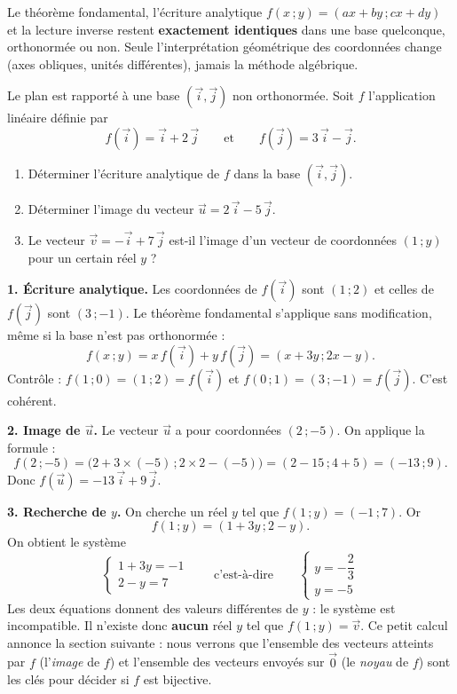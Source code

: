 \documentclass[11pt]{article}
\begin{document}
\begin{aretenir}
Le théorème fondamental, l'écriture analytique $f(x\,; y) = (ax + by\,; cx + dy)$ et la lecture inverse restent \textbf{exactement identiques} dans une base quelconque, orthonormée ou non. Seule l'interprétation géométrique des coordonnées change (axes obliques, unités différentes), jamais la méthode algébrique.
\end{aretenir}

\begin{exoresolu}
Le plan est rapporté à une base $(\vec{i}, \vec{j})$ non orthonormée. Soit $f$ l'application linéaire définie par
\[ f(\vec{i}) = \vec{i} + 2\,\vec{j} \qquad \text{et} \qquad f(\vec{j}) = 3\,\vec{i} - \vec{j}. \]
\begin{enumerate}
\item Déterminer l'écriture analytique de $f$ dans la base $(\vec{i}, \vec{j})$.
\item Déterminer l'image du vecteur $\vec{u} = 2\,\vec{i} - 5\,\vec{j}$.
\item Le vecteur $\vec{v} = -\vec{i} + 7\,\vec{j}$ est-il l'image d'un vecteur de coordonnées $(1\,; y)$ pour un certain réel $y$ ?
\end{enumerate}
\tcblower
\textbf{1. Écriture analytique.} Les coordonnées de $f(\vec{i})$ sont $(1\,; 2)$ et celles de $f(\vec{j})$ sont $(3\,; -1)$. Le théorème fondamental s'applique sans modification, même si la base n'est pas orthonormée :
\[ f(x\,; y) = x\,f(\vec{i}) + y\,f(\vec{j}) = (x + 3y\,; 2x - y). \]
Contrôle : $f(1\,; 0) = (1\,; 2) = f(\vec{i})$ et $f(0\,; 1) = (3\,; -1) = f(\vec{j})$. C'est cohérent.

\textbf{2. Image de $\vec{u}$.} Le vecteur $\vec{u}$ a pour coordonnées $(2\,; -5)$. On applique la formule :
\[ f(2\,; -5) = \bigl(2 + 3\times(-5)\,; 2\times 2 - (-5)\bigr) = (2 - 15\,; 4 + 5) = (-13\,; 9). \]
Donc $f(\vec{u}) = -13\,\vec{i} + 9\,\vec{j}$.

\textbf{3. Recherche de $y$.} On cherche un réel $y$ tel que $f(1\,; y) = (-1\,; 7)$. Or
\[ f(1\,; y) = (1 + 3y\,; 2 - y). \]
On obtient le système
\[ \begin{cases} 1 + 3y = -1 \\ 2 - y = 7 \end{cases} \qquad \text{c'est-à-dire} \qquad \begin{cases} y = -\dfrac{2}{3} \\[4pt] y = -5 \end{cases} \]
Les deux équations donnent des valeurs différentes de $y$ : le système est incompatible. Il n'existe donc \textbf{aucun} réel $y$ tel que $f(1\,; y) = \vec{v}$. Ce petit calcul annonce la section suivante : nous verrons que l'ensemble des vecteurs atteints par $f$ (l'\emph{image} de $f$) et l'ensemble des vecteurs envoyés sur $\vec{0}$ (le \emph{noyau} de $f$) sont les clés pour décider si $f$ est bijective.
\end{exoresolu}
\end{document}
